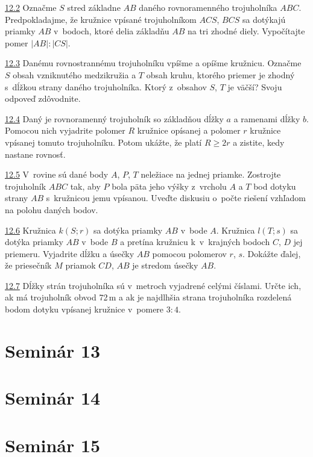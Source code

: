 \noindent \ul{12.2}  Označme $S$ stred základne $AB$ daného rovnoramenného trojuholníka $ABC$. Predpokladajme, že kružnice vpísané trojuholníkom $ACS$, $BCS$ sa dotýkajú priamky $AB$ v~bodoch, ktoré delia základňu $AB$ na tri zhodné diely. Vypočítajte pomer $|AB| : |CS|$.




\noindent \ul{12.3}  Danému rovnostrannému trojuholníku vpíšme a opíšme kružnicu. Označme $S$ obsah vzniknutého medzikružia a $T$ obsah kruhu, ktorého priemer je zhodný s~dĺžkou strany daného trojuholníka. Ktorý z~obsahov $S$, $T$ je väčší? Svoju odpoveď zdôvodnite.




\noindent \ul{12.4}  Daný je rovnoramenný trojuholník so základňou dĺžky $a$ a ramenami dĺžky $b$. Pomocou nich vyjadrite polomer $R$ kružnice opísanej a polomer $r$ kružnice vpísanej tomuto trojuholníku. Potom ukážte, že platí $R \geq 2r$ a zistite, kedy nastane rovnosť.




\noindent \ul{12.5}   V~rovine sú dané body $A$, $P$, $T$ neležiace na jednej priamke. Zostrojte trojuholník $ABC$ tak, aby $P$ bola päta jeho výšky z~vrcholu $A$ a $T$ bod dotyku strany $AB$ s~kružnicou jemu vpísanou. Uveďte diskusiu o~počte riešení vzhľadom na polohu daných bodov.




\noindent \ul{12.6}  Kružnica $k(S; r)$ sa dotýka priamky $AB$ v~bode $A$. Kružnica $l(T; s)$ sa dotýka priamky $AB$ v~bode $B$ a pretína kružnicu k~v~krajných bodoch $C$, $D$ jej priemeru. Vyjadrite dĺžku a úsečky $AB$ pomocou polomerov $r$, $s$. Dokážte ďalej, že priesečník $M$ priamok $CD$, $AB$ je stredom úsečky $AB$.




\noindent \ul{12.7}  Dĺžky strán trojuholníka sú v~metroch vyjadrené celými číslami. Určte ich, ak má trojuholník obvod 72\,m a ak je najdlhšia strana trojuholníka rozdelená bodom dotyku vpísanej kružnice v~pomere $3 : 4.$




\section*{Seminár 13}

\section*{Seminár 14}

\section*{Seminár 15}

